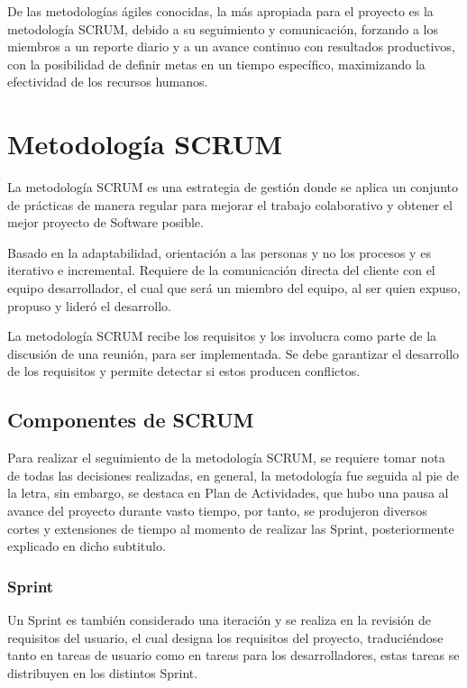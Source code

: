 De las metodologías ágiles conocidas, la más apropiada para el proyecto es la metodología SCRUM, debido a su seguimiento y comunicación, forzando a los miembros a un reporte diario y a un avance continuo con resultados productivos, con la posibilidad de definir metas en un tiempo específico, maximizando la efectividad de los recursos humanos.

\section{Metodología SCRUM}

La metodología SCRUM es una estrategia de gestión donde se aplica un conjunto de prácticas de manera regular para mejorar el trabajo colaborativo y obtener el mejor proyecto de Software posible\cite{scrumdiapo}.

Basado en la adaptabilidad, orientación a las personas y no los procesos y es iterativo e incremental. Requiere de la comunicación directa del cliente con el equipo desarrollador, el cual que será un miembro del equipo, al ser quien expuso, propuso y lideró el desarrollo.

La metodología SCRUM recibe los requisitos y los involucra como parte de la discusión de una reunión, para ser implementada. Se debe garantizar el desarrollo de los requisitos y permite detectar si estos producen conflictos.

\subsection{Componentes de SCRUM}

Para realizar el seguimiento de la metodología SCRUM, se requiere tomar nota de todas las decisiones realizadas, en general, la metodología fue seguida al pie de la letra, sin embargo, se destaca en Plan de Actividades, que hubo una pausa al avance del proyecto durante vasto tiempo, por tanto, se produjeron diversos cortes y extensiones de tiempo al momento de realizar las Sprint, posteriormente explicado en dicho subtitulo.

\subsubsection{Sprint}

Un Sprint es también considerado una iteración y se realiza en la revisión de requisitos del usuario, el cual designa los requisitos del proyecto, traduciéndose tanto en tareas de usuario como en tareas para los desarrolladores, estas tareas se distribuyen en los distintos Sprint.

